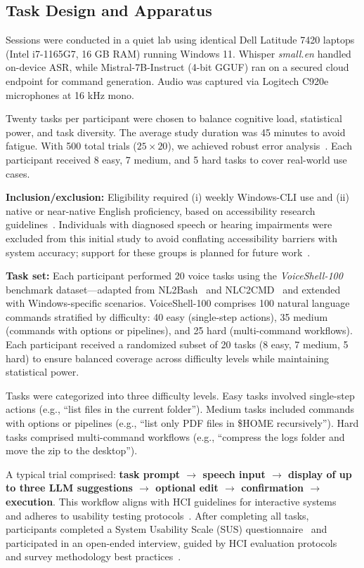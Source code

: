 \documentclass[a4paper,12pt]{article}
\begin{document}
\subsection{Task Design and Apparatus}
\noindent Sessions were conducted in a quiet lab using identical Dell Latitude 7420 laptops (Intel i7-1165G7, 16 GB RAM) running Windows 11. Whisper \textit{small.en} handled on-device ASR, while Mistral-7B-Instruct (4-bit GGUF) ran on a secured cloud endpoint for command generation. Audio was captured via Logitech C920e microphones at 16 kHz mono.

\noindent Twenty tasks per participant were chosen to balance cognitive load, statistical power, and task diversity. The average study duration was 45 minutes to avoid fatigue. With 500 total trials ($25 \times 20$), we achieved robust error analysis~\cite{ref4}. Each participant received 8 easy, 7 medium, and 5 hard tasks to cover real-world use cases. 

\noindent\textbf{Inclusion/exclusion:} Eligibility required (i) weekly Windows-CLI use and (ii) native or near-native English proficiency, based on accessibility research guidelines~\cite{ref3}. Individuals with diagnosed speech or hearing impairments were excluded from this initial study to avoid conflating accessibility barriers with system accuracy; support for these groups is planned for future work~\cite{ref4}.

\noindent\textbf{Task set:} Each participant performed 20 voice tasks using the \textit{VoiceShell-100} benchmark dataset—adapted from NL2Bash~\cite{ref26} and NLC2CMD~\cite{ref27} and extended with Windows-specific scenarios. VoiceShell-100 comprises 100 natural language commands stratified by difficulty: 40 easy (single-step actions), 35 medium (commands with options or pipelines), and 25 hard (multi-command workflows). Each participant received a randomized subset of 20 tasks (8 easy, 7 medium, 5 hard) to ensure balanced coverage across difficulty levels while maintaining statistical power.

Tasks were categorized into three difficulty levels. Easy tasks involved single-step actions (e.g., ``list files in the current folder''). Medium tasks included commands with options or pipelines (e.g., ``list only PDF files in \$HOME recursively''). Hard tasks comprised multi-command workflows (e.g., ``compress the logs folder and move the zip to the desktop'').

A typical trial comprised: \textbf{task prompt $\to$ speech input $\to$ display of up to three LLM suggestions $\to$ optional edit $\to$ confirmation $\to$ execution}. This workflow aligns with HCI guidelines for interactive systems~\cite{ref12} and adheres to usability testing protocols~\cite{ref9}. After completing all tasks, participants completed a System Usability Scale (SUS) questionnaire~\cite{ref15,ref17} and participated in an open-ended interview, guided by HCI evaluation protocols~\cite{ref23} and survey methodology best practices~\cite{ref24}.
\end{document}
